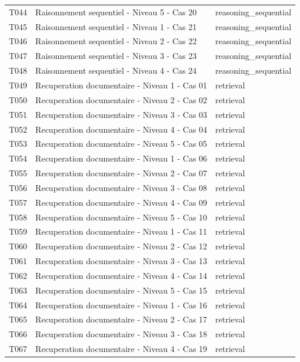 \begin{longtable}{@{}lll@{}}
T044 & Raisonnement sequentiel - Niveau 5 - Cas 20 & reasoning\_sequential \\
T045 & Raisonnement sequentiel - Niveau 1 - Cas 21 & reasoning\_sequential \\
T046 & Raisonnement sequentiel - Niveau 2 - Cas 22 & reasoning\_sequential \\
T047 & Raisonnement sequentiel - Niveau 3 - Cas 23 & reasoning\_sequential \\
T048 & Raisonnement sequentiel - Niveau 4 - Cas 24 & reasoning\_sequential \\
T049 & Recuperation documentaire - Niveau 1 - Cas 01 & retrieval \\
T050 & Recuperation documentaire - Niveau 2 - Cas 02 & retrieval \\
T051 & Recuperation documentaire - Niveau 3 - Cas 03 & retrieval \\
T052 & Recuperation documentaire - Niveau 4 - Cas 04 & retrieval \\
T053 & Recuperation documentaire - Niveau 5 - Cas 05 & retrieval \\
T054 & Recuperation documentaire - Niveau 1 - Cas 06 & retrieval \\
T055 & Recuperation documentaire - Niveau 2 - Cas 07 & retrieval \\
T056 & Recuperation documentaire - Niveau 3 - Cas 08 & retrieval \\
T057 & Recuperation documentaire - Niveau 4 - Cas 09 & retrieval \\
T058 & Recuperation documentaire - Niveau 5 - Cas 10 & retrieval \\
T059 & Recuperation documentaire - Niveau 1 - Cas 11 & retrieval \\
T060 & Recuperation documentaire - Niveau 2 - Cas 12 & retrieval \\
T061 & Recuperation documentaire - Niveau 3 - Cas 13 & retrieval \\
T062 & Recuperation documentaire - Niveau 4 - Cas 14 & retrieval \\
T063 & Recuperation documentaire - Niveau 5 - Cas 15 & retrieval \\
T064 & Recuperation documentaire - Niveau 1 - Cas 16 & retrieval \\
T065 & Recuperation documentaire - Niveau 2 - Cas 17 & retrieval \\
T066 & Recuperation documentaire - Niveau 3 - Cas 18 & retrieval \\
T067 & Recuperation documentaire - Niveau 4 - Cas 19 & retrieval \\

\end{longtable}
